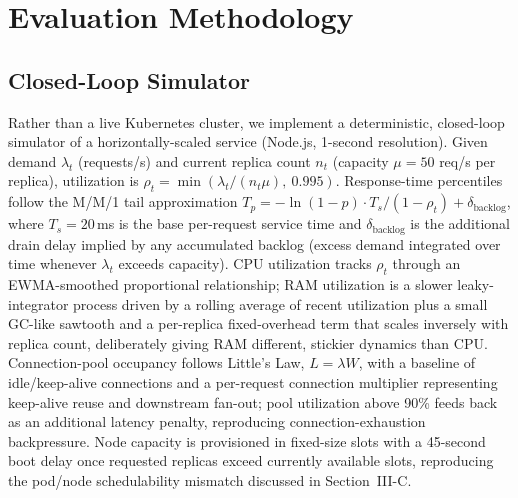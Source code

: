 \documentclass[conference]{IEEEtran}
\begin{document}
\section{Evaluation Methodology}

\subsection{Closed-Loop Simulator}
Rather than a live Kubernetes cluster, we implement a deterministic, closed-loop simulator of a
horizontally-scaled service (Node.js, 1-second resolution). Given demand $\lambda_t$ (requests/s) and
current replica count $n_t$ (capacity $\mu=50$ req/s per replica), utilization is
$\rho_t = \min(\lambda_t / (n_t \mu),\ 0.995)$. Response-time percentiles follow the M/M/1 tail
approximation $T_p = -\ln(1-p)\cdot T_s/(1-\rho_t) + \delta_{\mathrm{backlog}}$, where $T_s=20$\,ms is
the base per-request service time and $\delta_{\mathrm{backlog}}$ is the additional drain delay implied
by any accumulated backlog (excess demand integrated over time whenever $\lambda_t$ exceeds capacity).
CPU utilization tracks $\rho_t$ through an EWMA-smoothed proportional relationship; RAM utilization is
a slower leaky-integrator process driven by a rolling average of recent utilization plus a small
GC-like sawtooth and a per-replica fixed-overhead term that scales inversely with replica count,
deliberately giving RAM different, stickier dynamics than CPU. Connection-pool occupancy follows
Little's Law, $L = \lambda W$, with a baseline of idle/keep-alive connections and a per-request
connection multiplier representing keep-alive reuse and downstream fan-out; pool utilization above 90\%
feeds back as an additional latency penalty, reproducing connection-exhaustion backpressure. Node
capacity is provisioned in fixed-size slots with a 45-second boot delay once requested replicas exceed
currently available slots, reproducing the pod/node schedulability mismatch discussed in
Section~III-C.
\end{document}
